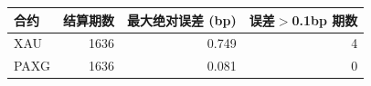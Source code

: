 \begin{tabular}{lrrr}
\toprule
合约 & 结算期数 & 最大绝对误差 (bp) & 误差$>$0.1bp 期数 \\
\midrule
XAU & 1636 & 0.749 & 4 \\
PAXG & 1636 & 0.081 & 0 \\
\bottomrule
\end{tabular}
